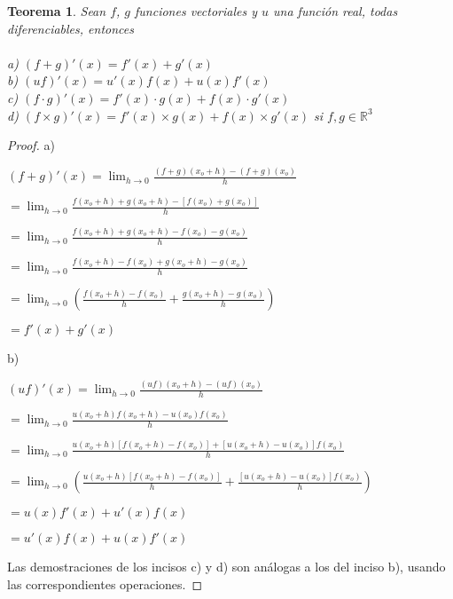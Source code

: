 \documentclass{book}
\newtheorem{theorem}{Teorema}[section]
\begin{document}
\begin{theorem}
Sean $f$, $g$ funciones vectoriales y $u$ una función real, todas diferenciables, entonces\\\\
a) $(f+g)'(x)=f'(x)+g'(x)$\\
b) $(uf)'(x)=u'(x)f(x)+u(x)f'(x)$\\
c) $(f \cdot g)'(x)=f'(x) \cdot g(x)+f(x) \cdot g'(x)$\\
d) $(f \times g)'(x)=f'(x) \times g(x)+f(x) \times g'(x)$ si $f,g \in \mathbb{R}^3$\\
\end{theorem}
\begin{proof}
 a)\\
 \begin{center}
 $(f+g)'(x)=\displaystyle \lim_{h \to 0}\frac{(f+g)(x_o+h)-(f+g)(x_o)}{h}$
 \end{center}
 \begin{center}
 $=\displaystyle \lim_{h \to 0}\frac{f(x_o+h)+g(x_o+h)-\left[f(x_o)+g(x_o)\right]}{h}$
 \end{center}
 \begin{center}
 $=\displaystyle \lim_{h \to 0}\frac{f(x_o+h)+g(x_o+h)-f(x_o)-g(x_o)}{h}$
 \end{center}
 \begin{center}
 $=\displaystyle \lim_{h \to 0}\frac{f(x_o+h)-f(x_o)+g(x_o+h)-g(x_o)}{h}$
 \end{center}
  \begin{center}
 $=\displaystyle \lim_{h \to 0}\left(\frac{f(x_o+h)-f(x_o)}{h}+\frac{g(x_o+h)-g(x_o)}{h}\right)$
 \end{center}
 \begin{center}
 $=f'(x)+g'(x)$
 \end{center}
 b)
 \begin{center}
 $(uf)'(x)=\displaystyle \lim_{h \to 0}\frac{(uf)(x_o+h)-(uf)(x_o)}{h}$
 \end{center}
 \begin{center}
 $=\displaystyle \lim_{h \to 0}\frac{u(x_o+h)f(x_o+h)-u(x_o)f(x_o)}{h}$
 \end{center}
  \begin{center}
 $=\displaystyle \lim_{h \to 0}\frac{u(x_o+h)\left[f(x_o+h)-f(x_o)\right]+\left[u(x_o+h)-u(x_o)\right]f(x_o)}{h}$
 \end{center}
 \begin{center}
 $=\displaystyle \lim_{h \to 0}\left(\frac{u(x_o+h)\left[f(x_o+h)-f(x_o)\right]}{h}+\frac{\left[u(x_o+h)-u(x_o)\right]f(x_o)}{h}\right)$
 \end{center}
  \begin{center}
 $=u(x)f'(x)+u'(x)f(x)$
  \end{center}
    \begin{center}
 $=u'(x)f(x)+u(x)f'(x)$
  \end{center}
 Las demostraciones de los incisos c) y d) son análogas a los del inciso b), usando las correspondientes operaciones.
\end{proof}
\end{document}
